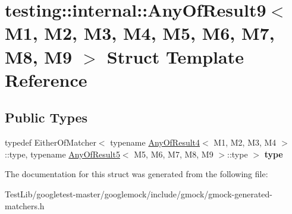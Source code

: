 \hypertarget{structtesting_1_1internal_1_1AnyOfResult9}{}\section{testing\+:\+:internal\+:\+:Any\+Of\+Result9$<$ M1, M2, M3, M4, M5, M6, M7, M8, M9 $>$ Struct Template Reference}
\label{structtesting_1_1internal_1_1AnyOfResult9}
\subsection*{Public Types}
\begin{DoxyCompactItemize}
\item 
\mbox{\label{structtesting_1_1internal_1_1AnyOfResult9_a308935fb02c62f502044dcc7b0a2b464}} 
typedef Either\+Of\+Matcher$<$ typename \hyperlink{structtesting_1_1internal_1_1AnyOfResult4}{Any\+Of\+Result4}$<$ M1, M2, M3, M4 $>$\+::type, typename \hyperlink{structtesting_1_1internal_1_1AnyOfResult5}{Any\+Of\+Result5}$<$ M5, M6, M7, M8, M9 $>$\+::type $>$ {\bfseries type}
\end{DoxyCompactItemize}


The documentation for this struct was generated from the following file\+:\begin{DoxyCompactItemize}
\item 
Test\+Lib/googletest-\/master/googlemock/include/gmock/gmock-\/generated-\/matchers.\+h\end{DoxyCompactItemize}
